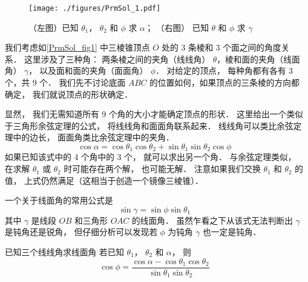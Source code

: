 


\begin{figure}[ht]
\centering
\texttt{[image: ./figures/PrmSol\_1.pdf]}
\caption{（左图）已知 $\theta_1$， $\theta_2$ 和 $\phi$ 求 $\alpha$； （右图） 已知 $\theta$ 和 $\phi$ 求 $\gamma$} \label{PrmSol_fig1}
\end{figure}

我们考虑如\autoref{PrmSol_fig1} 中三棱锥顶点 $O$ 处的 3 条棱和 3 个面之间的角度关系． 这里涉及了三种角： 两条棱之间的夹角（线线角） $\theta$，棱和面的夹角（线面角） $\gamma$， 以及面和面的夹角（面面角） $\phi$． 对给定的顶点， 每种角都有各有 3 个，共 9 个． 我们先不讨论底面 $ABC$ 的位置如何，如果顶点的三条棱的方向都确定， 我们就说顶点的形状确定．

显然， 我们无需知道所有 9 个角的大小才能确定顶点的形状． 这里给出一个类似于三角形余弦定理的公式， 将线线角和面面角联系起来． 线线角可以类比余弦定理中的边长， 面面角类比余弦定理中的夹角．
\begin{equation}\label{PrmSol_eq1}
\cos\alpha = \cos\theta_1 \cos\theta_2 + \sin\theta_1 \sin\theta_2 \cos\phi
\end{equation}
如果已知该式中的 4 个角中的 3 个， 就可以求出另一个角． 与余弦定理类似， 在求解 $\theta_1$ 或 $\theta_2$ 时可能存在两个解， 也可能无解． 注意如果我们交换 $\theta_1$ 和 $\theta_2$ 的值， 上式仍然满足（这相当于创造一个镜像三棱锥）．

一个关于线面角的常用公式是
\begin{equation}\label{PrmSol_eq2}
\sin\gamma = \sin\phi\sin\theta_1
\end{equation}
其中 $\gamma$ 是线段 $OB$ 和三角形 $OAC$ 的线面角． 虽然乍看之下从该式无法判断出 $\gamma$ 是钝角还是锐角， 但仔细分析可以发现若 $\phi$ 为钝角 $\gamma$ 也一定是钝角．

\begin{example}{已知三个线线角求线面角}
若已知 $\theta_1$， $\theta_2$ 和 $\alpha$， 则
\begin{equation}
\cos\phi = \frac{\cos\alpha - \cos\theta_1 \cos\theta_2}{\sin\theta_1 \sin\theta_2}
\end{equation}
\end{example}

